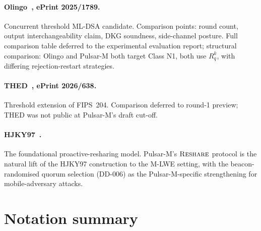 \documentclass[11pt,a4paper]{article}
\theoremstyle{definition}
\theoremstyle{remark}
\newcommand{\Rq}{R_q}
\newcommand{\Reshare}{\textsc{Reshare}}
\begin{document}
\paragraph{Olingo~\cite{olingo2025}, ePrint 2025/1789.}
Concurrent threshold ML-DSA candidate. Comparison points: round
count, output interchangeability claim, DKG soundness, side-channel
posture. Full comparison table deferred to the experimental
evaluation report; structural comparison: Olingo and Pulsar-M both
target Class N1, both use $\Rq^k$, with differing rejection-restart
strategies.

\paragraph{THED~\cite{thed2026}, ePrint 2026/638.}
Threshold extension of FIPS~204. Comparison deferred to round-1
preview; THED was not public at Pulsar-M's draft cut-off.

\paragraph{HJKY97~\cite{hjky97}.}
The foundational proactive-resharing model. Pulsar-M's $\Reshare$
protocol is the natural lift of the HJKY97 construction to the M-LWE
setting, with the beacon-randomised quorum selection (DD-006) as the
Pulsar-M-specific strengthening for mobile-adversary attacks.

\appendix
\section{Notation summary}
\label{sec:notation-table}
\end{document}

